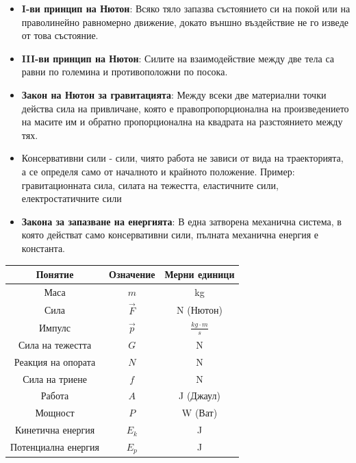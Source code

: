 \documentclass[fleqn, 12pt]{article}
\theoremstyle{definition}
\begin{document}
\begin{itemize}
\item \textbf{I-ви принцип на Нютон}: Всяко тяло запазва състоянието си на покой или на праволинейно
равномерно движение, докато външно въздействие не го изведе от това състояние.
\item \textbf{III-ви принцип на Нютон}: Силите на взаимодействие между две тела са равни
по големина и противоположни по посока.
\item \textbf{Закон на Нютон за гравитацията}: Между всеки две материални точки
действа сила на привличане, която е правопропорционална на произведението на
масите им и обратно пропорционална на квадрата на разстоянието между тях.
\item Консервативни сили - сили, чиято работа не зависи от вида на траекторията, а се определя само от началното и крайното положение. Пример: гравитационната сила, силата на тежестта, еластичните сили, електростатичните сили
\item \textbf{Закона за запазване на енергията}: В една затворена механична система, в която
действат само консервативни сили, пълната механична енергия е константа.
\end{itemize}

\begin{center}
\begin{tabular}{ |c|c|c|}
\hline
\textbf{Понятие} &\textbf{Означение} & \textbf{Мерни единици}\\
\hline
Маса & $m$ & kg \\
\hline
Сила & $\vec{F}$ & N (Нютон) \\
\hline 
Импулс & $\vec{p}$ & $\frac{kg \cdot m}{s}$ \\
\hline
Сила на тежестта & $G$ & N\\
\hline
Реакция на опората & $N$ & N \\
\hline
Сила на триене & $f$ & N \\
\hline
Работа & $A$ & J (Джаул)\\
\hline
Мощност & $P$ & W (Ват)\\
\hline
Кинетична енергия & $E_k$ & J \\
\hline
Потенциална енергия & $E_p$ & J \\
\hline
\end{tabular}
\end{center}

\newpage
\end{document}
